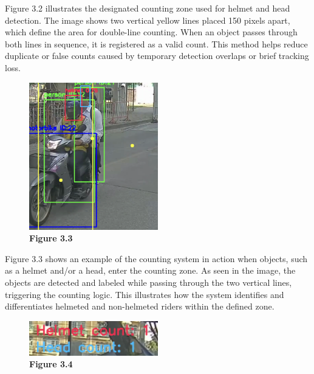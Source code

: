 \noindent\hspace{2.5em}Figure 3.2 illustrates the designated counting zone used for helmet and head detection. The image shows two vertical yellow lines placed 150 pixels apart, which define the area for double-line counting. When an object passes through both lines in sequence, it is registered as a valid count. This method helps reduce duplicate or false counts caused by temporary detection overlaps or brief tracking loss.

\begin{figure}[H] %
	\centering
	\includegraphics[width=0.5\textwidth]{headhel2.png}
	\vspace{0.5em}
	\caption*{\textbf{Figure 3.3}}
\end{figure}

\noindent\hspace{2.5em}Figure 3.3 shows an example of the counting system in action when objects, such as a helmet and/or a head, enter the counting zone. As seen in the image, the objects are detected and labeled while passing through the two vertical lines, triggering the counting logic. This illustrates how the system identifies and differentiates helmeted and non-helmeted riders within the defined zone.

\begin{figure}[H] %
	\centering
	\includegraphics[width=0.5\textwidth]{headhel3.png}
	\vspace{0.5em}
	\caption*{\textbf{Figure 3.4}}
\end{figure}

